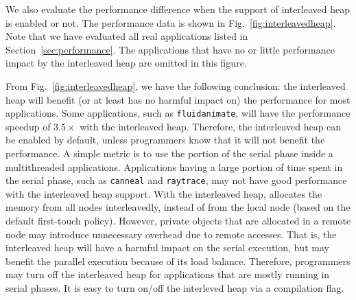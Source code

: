 We also evaluate the performance difference when the support of interleaved heap is enabled or not. The performance data is shown in Fig.~\ref{fig:interleavedheap}. Note that we have evaluated all real applications listed in Section~\ref{sec:performance}. The applications that have no or little performance impact by the interleaved heap are omitted in this figure. 

From Fig.~\ref{fig:interleavedheap}, we have the following conclusion: the interleaved heap will benefit (or at least has no harmful impact on) the performance for most applications. Some applications, such as \texttt{fluidanimate}, will have the performance speedup of $3.5\times$ with the interleaved heap. Therefore, the interleaved heap can be enabled by default, unless programmers know that it will not benefit the performance. A simple metric is to use the portion of the serial phase inside a multithreaded applications. Applications having a large portion of time spent in the serial phase, such as \texttt{canneal} and \texttt{raytrace}, may not have good performance with the interleaved heap support. With the interleaved heap, \NM{} allocates the memory from all nodes interleavedly, instead of from the local node (based on the default first-touch policy). However, private objects that are allocated in a remote node may introduce unnecessary overhead due to remote accesses.  That is, the interleaved heap will have a harmful impact on the serial execution, but may benefit the parallel execution because of its load balance. Therefore, programmers may turn off the interleaved heap for applications that are mostly running in serial phases. It is easy to turn on/off the interleved heap via a compilation flag.  








